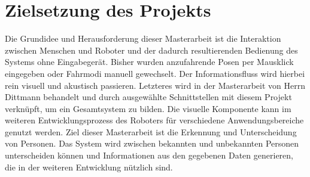 	\section{Zielsetzung des Projekts}
		Die Grundidee und Herausforderung dieser Masterarbeit ist die Interaktion zwischen Menschen und Roboter und der dadurch resultierenden Bedienung des Systems ohne Eingabegerät. Bisher wurden anzufahrende Posen per Mausklick eingegeben oder Fahrmodi manuell gewechselt. Der Informationsfluss wird hierbei rein visuell und akustisch passieren. Letzteres wird in der Masterarbeit von Herrn Dittmann behandelt und durch ausgewählte Schnittstellen mit diesem Projekt verknüpft, um ein Gesamtsystem zu bilden. Die visuelle Komponente kann im weiteren Entwicklungsprozess des Roboters für verschiedene Anwendungsbereiche genutzt werden. Ziel dieser Masterarbeit ist die Erkennung und Unterscheidung von Personen. Das System wird zwischen bekannten und unbekannten Personen unterscheiden können und Informationen aus den gegebenen Daten generieren, die in der weiteren Entwicklung nützlich sind. 
	